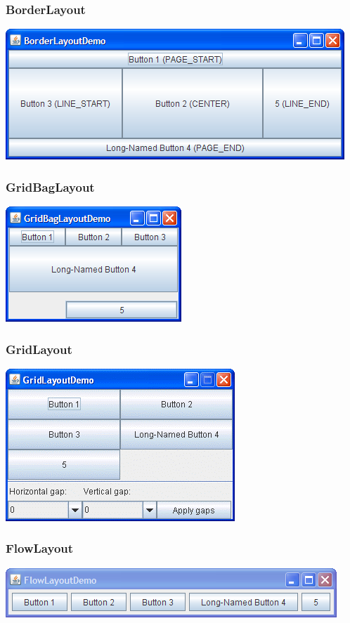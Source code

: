 \begin{frame}[fragile]
	\frametitle{BorderLayout}
	\includegraphics[scale=0.7]{BorderLayoutDemo.png}
\end{frame}

\begin{frame}[fragile]
	\frametitle{GridBagLayout}
	\includegraphics[scale=1]{GridBagLayoutDemo.png}
\end{frame}

\begin{frame}[fragile]
	\frametitle{GridLayout}
	\includegraphics[scale=1]{GridLayoutDemo.png}
\end{frame}

\begin{frame}[fragile]
	\frametitle{FlowLayout}
	\includegraphics[scale=0.8]{FlowLayoutDemo.png}
\end{frame}


